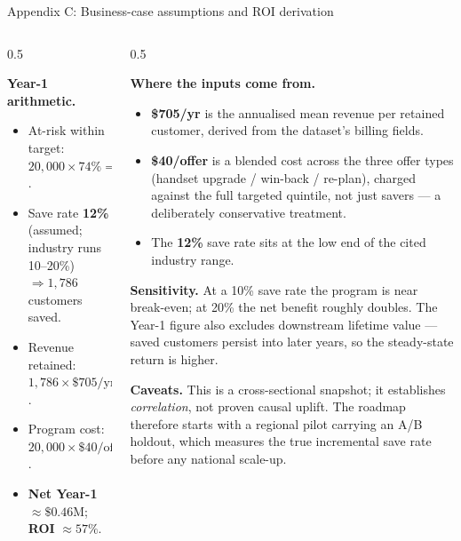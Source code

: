 \documentclass[aspectratio=169]{beamer}
\begin{document}
\begin{frame}{Appendix C: Business-case assumptions and ROI derivation}
\begin{columns}[T]
\begin{column}{0.5\textwidth}
{        \medskip
        \textbf{Year-1 arithmetic.}
        \begin{itemize}
            \item At-risk within target: $20{,}000 \times 74\% = 14{,}880$.
            \item Save rate \textbf{12\%} (assumed; industry runs 10--20\%)
                  $\Rightarrow 1{,}786$ customers saved.
            \item Revenue retained: $1{,}786 \times \$705/\text{yr}
                  \approx \$1.26\text{M}$.
            \item Program cost: $20{,}000 \times \$40/\text{offer}
                  = \$0.80\text{M}$.
            \item \textbf{Net Year-1} $\approx \$0.46$M; \textbf{ROI}
                  $\approx 57\%$.
        \end{itemize}
        \par}
    \end{column}
    \begin{column}{0.5\textwidth}
        {\fontsize{5}{6}\selectfont
        \textbf{Where the inputs come from.}
        \begin{itemize}
            \item \textbf{\$705/yr} is the annualised mean revenue per retained
                  customer, derived from the dataset's billing fields.
            \item \textbf{\$40/offer} is a blended cost across the three offer
                  types (handset upgrade / win-back / re-plan), charged against
                  the full targeted quintile, not just savers --- a deliberately
                  conservative treatment.
            \item The \textbf{12\%} save rate sits at the low end of the cited
                  industry range.
        \end{itemize}

        \medskip
        \textbf{Sensitivity.} At a 10\% save rate the program is near break-even;
        at 20\% the net benefit roughly doubles. The Year-1 figure also excludes
        downstream lifetime value --- saved customers persist into later years,
        so the steady-state return is higher.

        \medskip
        \textbf{Caveats.} This is a cross-sectional snapshot; it establishes
        \emph{correlation}, not proven causal uplift. The roadmap therefore
        starts with a regional pilot carrying an A/B holdout, which measures the
        true incremental save rate before any national scale-up.
        \par}
    \end{column}
    \end{columns}
\end{frame}
\end{document}

